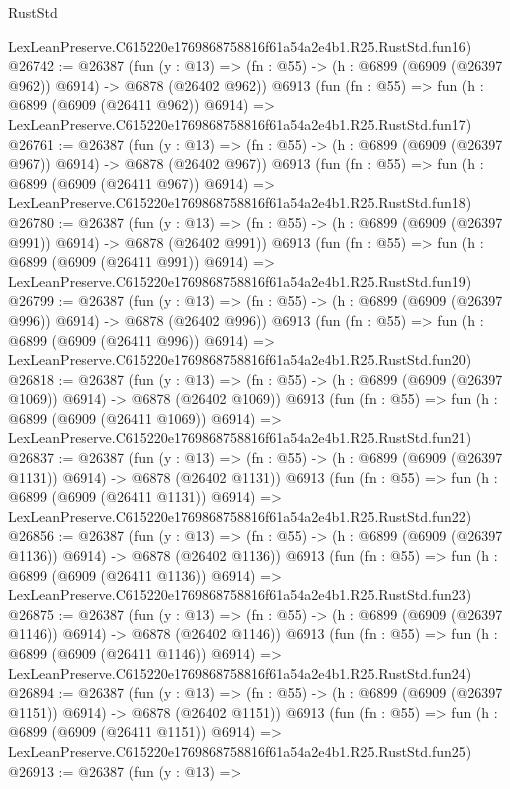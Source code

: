 \begin{lexlean}{RustStd}
\begin{coremodule}
    LexLeanPreserve.C615220e1769868758816f61a54a2e4b1.R25.RustStd.fun16)
@26742 := @26387
    (fun (y : @13) => (fn : @55) -> (h : @6899 (@6909 (@26397 @962)) @6914) -> @6878 (@26402 @962))
    @6913
    (fun (fn : @55) =>
    fun (h : @6899 (@6909 (@26411 @962)) @6914) =>
    LexLeanPreserve.C615220e1769868758816f61a54a2e4b1.R25.RustStd.fun17)
@26761 := @26387
    (fun (y : @13) => (fn : @55) -> (h : @6899 (@6909 (@26397 @967)) @6914) -> @6878 (@26402 @967))
    @6913
    (fun (fn : @55) =>
    fun (h : @6899 (@6909 (@26411 @967)) @6914) =>
    LexLeanPreserve.C615220e1769868758816f61a54a2e4b1.R25.RustStd.fun18)
@26780 := @26387
    (fun (y : @13) => (fn : @55) -> (h : @6899 (@6909 (@26397 @991)) @6914) -> @6878 (@26402 @991))
    @6913
    (fun (fn : @55) =>
    fun (h : @6899 (@6909 (@26411 @991)) @6914) =>
    LexLeanPreserve.C615220e1769868758816f61a54a2e4b1.R25.RustStd.fun19)
@26799 := @26387
    (fun (y : @13) => (fn : @55) -> (h : @6899 (@6909 (@26397 @996)) @6914) -> @6878 (@26402 @996))
    @6913
    (fun (fn : @55) =>
    fun (h : @6899 (@6909 (@26411 @996)) @6914) =>
    LexLeanPreserve.C615220e1769868758816f61a54a2e4b1.R25.RustStd.fun20)
@26818 := @26387
    (fun (y : @13) =>
    (fn : @55) -> (h : @6899 (@6909 (@26397 @1069)) @6914) -> @6878 (@26402 @1069))
    @6913
    (fun (fn : @55) =>
    fun (h : @6899 (@6909 (@26411 @1069)) @6914) =>
    LexLeanPreserve.C615220e1769868758816f61a54a2e4b1.R25.RustStd.fun21)
@26837 := @26387
    (fun (y : @13) =>
    (fn : @55) -> (h : @6899 (@6909 (@26397 @1131)) @6914) -> @6878 (@26402 @1131))
    @6913
    (fun (fn : @55) =>
    fun (h : @6899 (@6909 (@26411 @1131)) @6914) =>
    LexLeanPreserve.C615220e1769868758816f61a54a2e4b1.R25.RustStd.fun22)
@26856 := @26387
    (fun (y : @13) =>
    (fn : @55) -> (h : @6899 (@6909 (@26397 @1136)) @6914) -> @6878 (@26402 @1136))
    @6913
    (fun (fn : @55) =>
    fun (h : @6899 (@6909 (@26411 @1136)) @6914) =>
    LexLeanPreserve.C615220e1769868758816f61a54a2e4b1.R25.RustStd.fun23)
@26875 := @26387
    (fun (y : @13) =>
    (fn : @55) -> (h : @6899 (@6909 (@26397 @1146)) @6914) -> @6878 (@26402 @1146))
    @6913
    (fun (fn : @55) =>
    fun (h : @6899 (@6909 (@26411 @1146)) @6914) =>
    LexLeanPreserve.C615220e1769868758816f61a54a2e4b1.R25.RustStd.fun24)
@26894 := @26387
    (fun (y : @13) =>
    (fn : @55) -> (h : @6899 (@6909 (@26397 @1151)) @6914) -> @6878 (@26402 @1151))
    @6913
    (fun (fn : @55) =>
    fun (h : @6899 (@6909 (@26411 @1151)) @6914) =>
    LexLeanPreserve.C615220e1769868758816f61a54a2e4b1.R25.RustStd.fun25)
@26913 := @26387
    (fun (y : @13) =>

\end{coremodule}
\end{lexlean}
